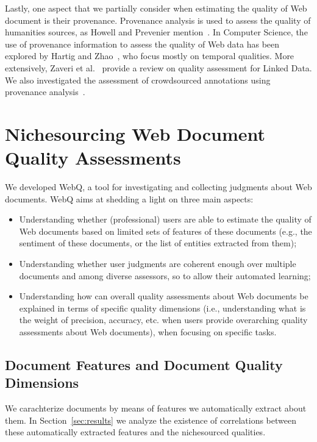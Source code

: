 \documentclass{llncs}
\begin{document}
Lastly, one aspect that we partially consider when estimating the quality of Web document is their provenance. Provenance analysis is used to assess the quality of humanities sources, as Howell and Prevenier mention~\cite{provenance}. In Computer Science,
the use of provenance information to assess the quality of Web data has been explored by Hartig and Zhao~\cite{hartig}, who focus mostly on temporal qualities. More extensively, Zaveri et al.~\cite{LDQ} provide a review on quality assessment for Linked Data. We also investigated the assessment of crowdsourced annotations using provenance analysis~\cite{jdiq2015,ifiptm2015}. 

\section{Nichesourcing Web Document Quality Assessments}
\label{sec:webq}
We developed WebQ, a tool for investigating and collecting judgments about Web documents. WebQ aims at shedding a light on three main aspects:
\begin{itemize}
\item Understanding whether (professional) users are able to estimate the quality of Web documents based on limited sets of features of these documents (e.g., the sentiment of these documents, or the list of entities extracted from them);
\item Understanding whether user judgments are coherent enough over multiple documents and among diverse assessors, so to allow their automated learning;
\item Understanding how can overall quality assessments about Web documents be explained in terms of specific quality dimensions (i.e., understanding what is the weight of precision, accuracy, etc. when users provide overarching quality assessments about Web documents), when focusing on specific tasks.
\end{itemize}

\subsection{Document Features and Document Quality Dimensions}
We carachterize documents by means of features we automatically extract about them. In Section~\ref{sec:results} we analyze the existence of correlations between these automatically extracted features and the nichesourced qualities.
\end{document}
